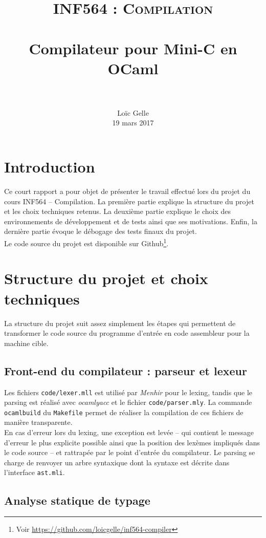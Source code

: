 \documentclass[paper=a4, fontsize=11pt]{scrartcl}
\title{	
		\usefont{OT1}{bch}{b}{n}
		\normalfont \normalsize \textsc{INF564 : Compilation} \\ [25pt]
		\horrule{0.5pt} \\[0.4cm]
		\huge Compilateur pour Mini-C en OCaml \\
		\horrule{2pt} \\[0.5cm]
}
\author{
		\normalfont 								\normalsize
        Lo\"{i}c Gelle\\[-3pt]		\normalsize
        19 mars 2017
}
\date{}
\numberwithin{figure}{section}			%
\numberwithin{table}{section}				%
\begin{document}
\maketitle
\section{Introduction}

Ce court rapport a pour objet de présenter le travail effectué lors du projet du cours INF564 -- Compilation. La première partie explique la structure du projet et les choix techniques retenus. La deuxième partie explique le choix des environnements de développement et de tests ainsi que ses motivations. Enfin, la dernière partie évoque le débogage des tests finaux du projet.\\

Le code source du projet est disponible sur Github\footnote{Voir \url{https://github.com/loicgelle/inf564-compiler}}.

\section{Structure du projet et choix techniques}

La structure du projet suit assez simplement les étapes qui permettent de transformer le code source du programme d'entrée en code assembleur pour la machine cible.

\subsection{Front-end du compilateur : parseur et lexeur}

Les fichiers \texttt{code/lexer.mll} est utilisé par \textit{Menhir} pour le lexing, tandis que le parsing est réalisé avec \textit{ocamlyacc} et le fichier \texttt{code/parser.mly}. La commande \texttt{ocamlbuild} du \texttt{Makefile} permet de réaliser la compilation de ces fichiers de manière transparente.\\

En cas d'erreur lors du lexing, une exception est levée -- qui contient le message d'erreur le plus explicite possible ainsi que la position des lexèmes impliqués dans le code source -- et rattrapée par le point d'entrée du compilateur. Le parsing se charge de renvoyer un arbre syntaxique dont la syntaxe est décrite dans l'interface \texttt{ast.mli}.

\subsection{Analyse statique de typage}
\end{document}
